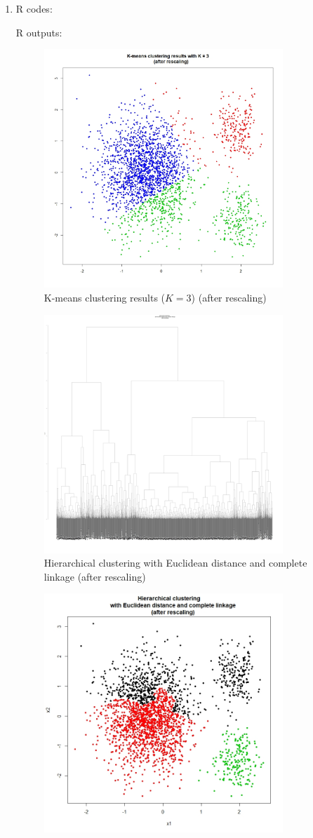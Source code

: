 \documentclass[10pt]{article}
\begin{document}
\begin{enumerate}[1)]
\item
R codes:

R outputs:

\begin{figure}[H]
  \centering
  \includegraphics[width=9cm,height=9cm]{p34a.jpeg}
  \caption{K-means clustering results ($K=3$) (after rescaling)}
\end{figure}

\begin{figure}[H]
  \centering
  \includegraphics[width=9cm,height=9cm]{p34b.jpeg}
  \caption{Hierarchical clustering with Euclidean distance and complete linkage (after rescaling)}
\end{figure}
\begin{figure}[H]
  \centering
  \includegraphics[width=9cm,height=9cm]{p34c.jpeg}

\end{figure}
\end{enumerate}
\end{document}
